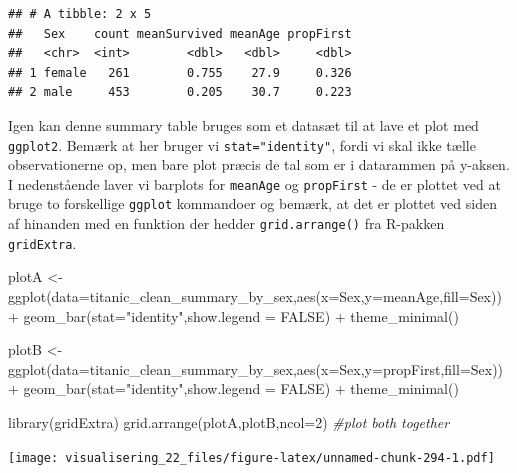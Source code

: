\documentclass[
]{book}
\newenvironment{Shaded}{\begin{snugshade}}{\end{snugshade}}
\newcommand{\AttributeTok}[1]{\textcolor[rgb]{0.77,0.63,0.00}{#1}}
\newcommand{\CommentTok}[1]{\textcolor[rgb]{0.56,0.35,0.01}{\textit{#1}}}
\newcommand{\ConstantTok}[1]{\textcolor[rgb]{0.00,0.00,0.00}{#1}}
\newcommand{\DecValTok}[1]{\textcolor[rgb]{0.00,0.00,0.81}{#1}}
\newcommand{\FunctionTok}[1]{\textcolor[rgb]{0.00,0.00,0.00}{#1}}
\newcommand{\NormalTok}[1]{#1}
\newcommand{\OtherTok}[1]{\textcolor[rgb]{0.56,0.35,0.01}{#1}}
\newcommand{\SpecialCharTok}[1]{\textcolor[rgb]{0.00,0.00,0.00}{#1}}
\newcommand{\StringTok}[1]{\textcolor[rgb]{0.31,0.60,0.02}{#1}}
\begin{document}
\begin{verbatim}
## # A tibble: 2 x 5
##   Sex    count meanSurvived meanAge propFirst
##   <chr>  <int>        <dbl>   <dbl>     <dbl>
## 1 female   261        0.755    27.9     0.326
## 2 male     453        0.205    30.7     0.223
\end{verbatim}

Igen kan denne summary table bruges som et datasæt til at lave et plot med \texttt{ggplot2}. Bemærk at her bruger vi \texttt{stat="identity"}, fordi vi skal ikke tælle observationerne op, men bare plot præcis de tal som er i datarammen på y-aksen. I nedenstående laver vi barplots for \texttt{meanAge} og \texttt{propFirst} - de er plottet ved at bruge to forskellige \texttt{ggplot} kommandoer og bemærk, at det er plottet ved siden af hinanden med en funktion der hedder \texttt{grid.arrange()} fra R-pakken \texttt{gridExtra}.

\begin{Shaded}
\begin{Highlighting}[]
\NormalTok{plotA }\OtherTok{\textless{}{-}} \FunctionTok{ggplot}\NormalTok{(}\AttributeTok{data=}\NormalTok{titanic\_clean\_summary\_by\_sex,}\FunctionTok{aes}\NormalTok{(}\AttributeTok{x=}\NormalTok{Sex,}\AttributeTok{y=}\NormalTok{meanAge,}\AttributeTok{fill=}\NormalTok{Sex)) }\SpecialCharTok{+} 
  \FunctionTok{geom\_bar}\NormalTok{(}\AttributeTok{stat=}\StringTok{"identity"}\NormalTok{,}\AttributeTok{show.legend =} \ConstantTok{FALSE}\NormalTok{) }\SpecialCharTok{+} 
  \FunctionTok{theme\_minimal}\NormalTok{()}

\NormalTok{plotB }\OtherTok{\textless{}{-}} \FunctionTok{ggplot}\NormalTok{(}\AttributeTok{data=}\NormalTok{titanic\_clean\_summary\_by\_sex,}\FunctionTok{aes}\NormalTok{(}\AttributeTok{x=}\NormalTok{Sex,}\AttributeTok{y=}\NormalTok{propFirst,}\AttributeTok{fill=}\NormalTok{Sex)) }\SpecialCharTok{+} 
  \FunctionTok{geom\_bar}\NormalTok{(}\AttributeTok{stat=}\StringTok{"identity"}\NormalTok{,}\AttributeTok{show.legend =} \ConstantTok{FALSE}\NormalTok{) }\SpecialCharTok{+} 
  \FunctionTok{theme\_minimal}\NormalTok{()}

\FunctionTok{library}\NormalTok{(gridExtra)}
\FunctionTok{grid.arrange}\NormalTok{(plotA,plotB,}\AttributeTok{ncol=}\DecValTok{2}\NormalTok{) }\CommentTok{\#plot both together}
\end{Highlighting}
\end{Shaded}

\texttt{[image: visualisering\_22\_files/figure-latex/unnamed-chunk-294-1.pdf]}
\end{document}
